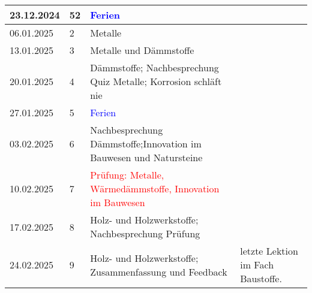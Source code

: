 \documentclass[
11pt,
captions=tableheading,
headings=big,
headsepline,
footsepline, 
captions=tableheading,
parskip=half-,
]{scrartcl}
\newcommand{\red}[1]{\textcolor{red}{#1}}
\begin{document}
\begin{table}[H]
\begin{tabular}{llp{8.5cm}p{3.5cm}}
        \midrule
        23.12.2024     & 52          & \textcolor{blue}{Ferien}                                                                                                       \\
        \midrule
        06.01.2025     & 2           & Metalle                                                                                    & {}                                \\
        13.01.2025     & 3           & Metalle und Dämmstoffe                                                                     & {}                                \\
        20.01.2025     & 4           & Dämmstoffe; Nachbesprechung Quiz Metalle; Korrosion schläft nie                 & {}                                \\
        \midrule
        27.01.2025     & 5           & \textcolor{blue}{Ferien}                                                                   & {}                                \\
        \midrule
        03.02.2025     & 6           & Nachbesprechung Dämmstoffe;Innovation im Bauwesen und Natursteine                          & {}                                \\
        10.02.2025     & 7           & \red{Prüfung: Metalle, Wärmedämmstoffe, Innovation im Bauwesen}                            & {}                                \\
        17.02.2025     & 8           & Holz- und Holzwerkstoffe; Nachbesprechung Prüfung                                          & {}                                \\
        24.02.2025     & 9           & Holz- und Holzwerkstoffe; Zusammenfassung und Feedback                                     & letzte Lektion im Fach Baustoffe. \\
        \bottomrule
    \end{tabular}
\end{table}
\end{document}
